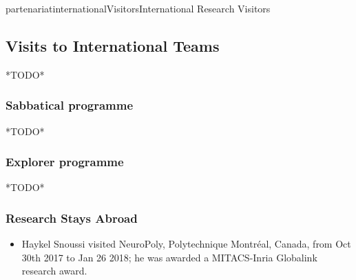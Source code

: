 \documentclass{ra2018}
\begin{document}
\begin{module}{partenariat}{internationalVisitors}{International Research Visitors}
\subsection{Visits to International Teams}
*TODO*
   \subsubsection{Sabbatical programme}
   *TODO*




   \subsubsection{Explorer programme}
   *TODO*




   \subsubsection{Research Stays Abroad}
   \begin{itemize}
     \item Haykel Snoussi visited NeuroPoly, Polytechnique Montréal, Canada, from Oct 30th 2017 to Jan 26 2018; he was awarded a MITACS-Inria Globalink research award.
   \end{itemize}






\end{module}


\end{document}
